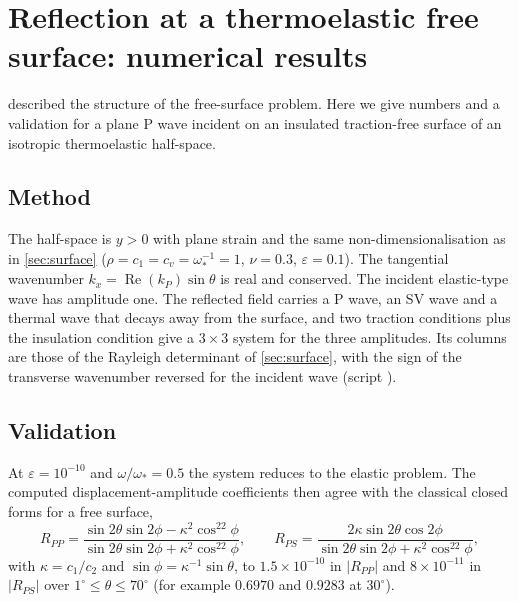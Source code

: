 \section{Reflection at a thermoelastic free surface: numerical results}\label{sec:reflection}

 described the structure of the free-surface problem. Here we give numbers and a validation for a plane P wave incident on an insulated traction-free surface of an isotropic thermoelastic half-space.

\subsection{Method}
The half-space is $y>0$ with plane strain and the same non-dimensionalisation as in \cref{sec:surface} ($\rho=c_1=c_v=\omega_*^{-1}=1$, $\nu=0.3$, $\varepsilon=0.1$). The tangential wavenumber $k_x=\operatorname{Re}(k_P)\sin\theta$ is real and conserved. The incident elastic-type wave has amplitude one. The reflected field carries a P wave, an SV wave and a thermal wave that decays away from the surface, and two traction conditions plus the insulation condition give a $3\times3$ system for the three amplitudes. Its columns are those of the Rayleigh determinant of \cref{sec:surface}, with the sign of the transverse wavenumber reversed for the incident wave (script ).

\subsection{Validation}
At $\varepsilon=10^{-10}$ and $\omega/\omega_*=0.5$ the system reduces to the elastic problem. The computed displacement-amplitude coefficients then agree with the classical closed forms for a free surface,
\begin{equation}
R_{PP}=\frac{\sin2\theta\sin2\phi-\kappa^2\cos^22\phi}{\sin2\theta\sin2\phi+\kappa^2\cos^22\phi},\qquad
R_{PS}=\frac{2\kappa\sin2\theta\cos2\phi}{\sin2\theta\sin2\phi+\kappa^2\cos^22\phi},
\end{equation}
with $\kappa=c_1/c_2$ and $\sin\phi=\kappa^{-1}\sin\theta$, to $1.5\times10^{-10}$ in $|R_{PP}|$ and $8\times10^{-11}$ in $|R_{PS}|$ over $1^\circ\le\theta\le70^\circ$ (for example $0.6970$ and $0.9283$ at $30^\circ$).

